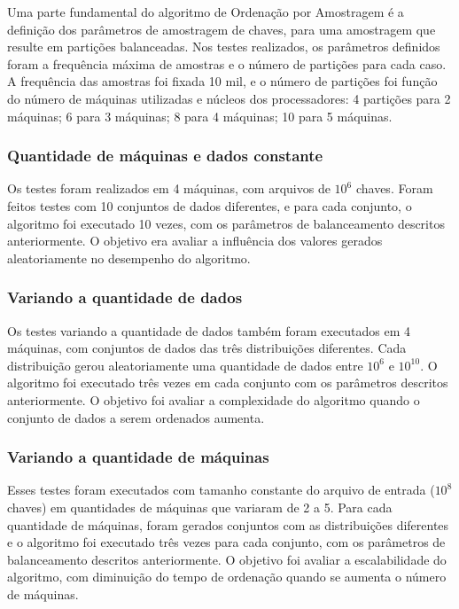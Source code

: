 Uma parte fundamental do algoritmo de Ordenação por Amostragem é a definição dos parâmetros de amostragem de chaves, para uma amostragem que resulte em partições balanceadas. Nos testes realizados, os parâmetros definidos foram a frequência máxima de amostras e o número de partições para cada caso.  A frequência das amostras foi fixada 10 mil, e o número de partições foi função do número de máquinas utilizadas e núcleos dos processadores: 
			4 partições para 2 máquinas; 6 para 3 máquinas; 8 para 4 máquinas; 10 para 5 máquinas.



\subsubsection{Quantidade de máquinas e dados constante} 

Os testes foram realizados em 4 máquinas, com arquivos de $10^{6}$ chaves. Foram feitos testes com 10 conjuntos de dados diferentes, e para cada conjunto, o algoritmo foi executado 10 vezes, com os parâmetros de balanceamento descritos anteriormente.  O objetivo era avaliar a influência dos valores gerados aleatoriamente no desempenho do algoritmo. 

\subsubsection{Variando a quantidade de dados}
 
 Os testes variando a quantidade de dados também foram executados em 4 máquinas, com conjuntos de dados das três distribuições diferentes. Cada distribuição gerou aleatoriamente uma quantidade de dados entre $10^{6}$ e $10^{10}$. O algoritmo foi executado três vezes em cada conjunto com os parâmetros descritos anteriormente. O objetivo foi avaliar a complexidade do algoritmo quando o conjunto de dados a serem ordenados aumenta.
 
\subsubsection{Variando a quantidade de máquinas}

Esses testes foram executados com tamanho constante do arquivo de entrada  ($10^{8}$ chaves) em quantidades de máquinas que variaram de 2 a 5. 
Para cada quantidade de máquinas, foram gerados conjuntos com as distribuições diferentes e o algoritmo foi executado três vezes para cada conjunto, com os parâmetros de balanceamento descritos anteriormente. O objetivo foi avaliar a escalabilidade do algoritmo, com diminuição do tempo de ordenação quando se aumenta o número de máquinas.

